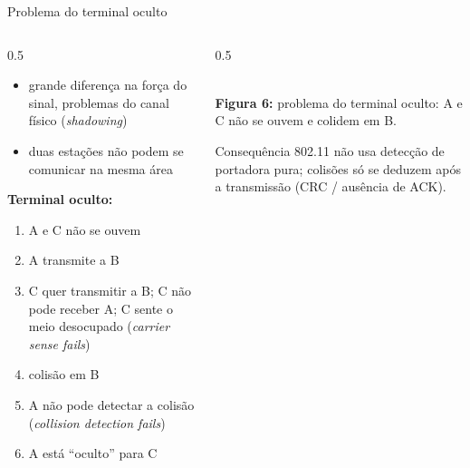 \documentclass[aspectratio=169,11pt]{beamer}
\begin{document}
\begin{frame}{Problema do terminal oculto}
  \begin{columns}
    \begin{column}{0.5\textwidth}
      \begin{itemize}
        \item grande diferença na força do sinal, problemas do canal físico (\emph{shadowing})
        \item duas estações não podem se comunicar na mesma área
      \end{itemize}
      \textbf{Terminal oculto:}
      \begin{enumerate}
        \item A e C não se ouvem
        \item A transmite a B
        \item C quer transmitir a B; C não pode receber A; C sente o meio desocupado (\emph{carrier sense fails})
        \item colisão em B
        \item A não pode detectar a colisão (\emph{collision detection fails})
        \item A está ``oculto'' para C
      \end{enumerate}
    \end{column}
    \begin{column}{0.5\textwidth}
      \begin{center}
        \\[1mm]
        {\scriptsize \textbf{Figura 6:} problema do terminal oculto: A e C não se ouvem e colidem em B.}
      \end{center}
      \begin{alertblock}{Consequência}
        802.11 não usa detecção de portadora pura; colisões só se deduzem após a transmissão (CRC / ausência de ACK).
      \end{alertblock}
    \end{column}
  \end{columns}
\end{frame}
\end{document}

